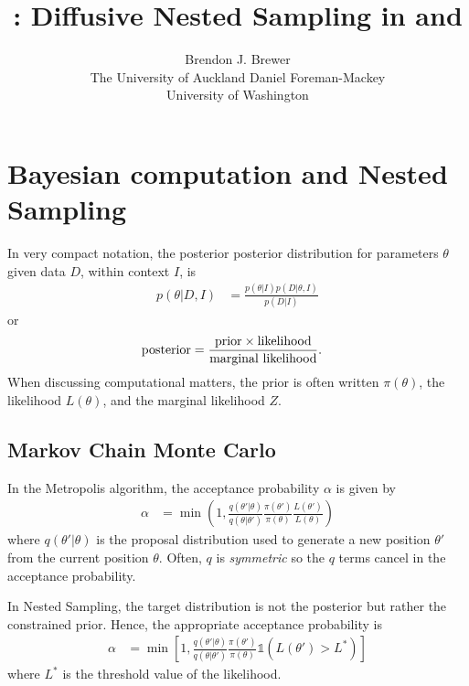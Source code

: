 \documentclass[article]{jss}
\author{Brendon J. Brewer\\The University of Auckland\And 
        Daniel Foreman-Mackey\\University of Washington}
\title{\pkg{DNest4}: Diffusive Nested Sampling in
\proglang{C++} and \proglang{Python}}
\newcommand{\params}{\theta}
\newcommand{\data}{D}
\begin{document}
\maketitle

\setlength{\parindent}{0pt}
\setlength{\parskip}{8pt}

\section{Bayesian computation and Nested Sampling}

In very compact notation, the posterior
posterior distribution for parameters $\params$ given data $\data$, within
context $I$, is
\begin{align}
p(\params | \data, I) &=
\frac{p(\params | I)p(\data | \params, I)}{p(\data | I)}
\end{align}
or
\begin{align}
\textnormal{posterior} &=
\frac{\textnormal{prior} \times \textnormal{likelihood}}
     {\textnormal{marginal likelihood}}.
\end{align}
When discussing computational matters, the prior is
often written $\pi(\theta)$, the likelihood $L(\theta)$,
and the marginal likelihood $Z$.

\subsection{Markov Chain Monte Carlo}
In the Metropolis algorithm, the acceptance probability $\alpha$
is given by
\begin{align}
\alpha &= \min\left(1,
\frac{q(\params'|\params)}{q(\params | \params')}
\frac{\pi(\params')}{\pi(\params)}\frac{L(\params')}{L(\params)}
\right)
\end{align}
where $q(\theta' | \theta)$ is the proposal distribution used to generate
a new position $\theta'$ from the current position $\theta$. Often,
$q$ is {\em symmetric} so the $q$ terms cancel in the acceptance probability.

In Nested Sampling, the target distribution is not the posterior but rather
the constrained prior. Hence, the appropriate acceptance probability is
\begin{align}
\alpha &= \min\left[1,
\frac{q(\params'|\params)}{q(\params | \params')}
\frac{\pi(\params')}{\pi(\params)}
\mathds{1}\left(L(\params') > L^*\right)
\right]
\end{align}
where $L^*$ is the threshold value of the likelihood.
\end{document}
